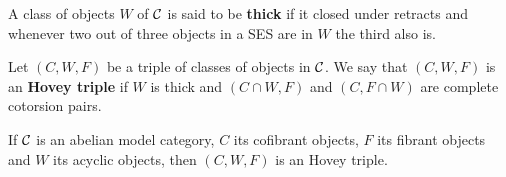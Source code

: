 \begin{definition}
	A class of objects $W$ of $\mathcal{C}$ is said to be \textbf{thick} if it closed under retracts and whenever two out of three objects in a SES are in $W$ the third also is. 
\end{definition}

\begin{definition}
	Let $(C,W,F)$ be a triple of classes of objects in $\mathcal{C}$. We say that $(C,W,F)$ is an \textbf{Hovey triple} if $W$ is thick and $(C\cap W, F)$ and $(C, F\cap W)$ are complete cotorsion pairs.
\end{definition}



\begin{theorem}
	If $\mathcal{C}$ is an abelian model category, $C$ its cofibrant objects, $F$ its fibrant objects and $W$ its acyclic objects, then $(C,W,F)$ is an Hovey triple.
\end{theorem}

